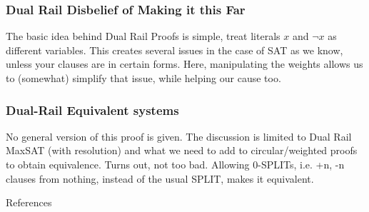 \documentclass[aspectratio=169]{beamer}
\newcounter{notes}
\begin{document}
    \begin{frame}
        \frametitle{Dual Rail Disbelief of Making it this Far}
    
        The basic idea behind Dual Rail Proofs is simple, treat literals $x$ and
        $\lnot x$ as different variables. \pause This creates several issues in
        the case of SAT as we know, unless your clauses are in certain forms.
        \pause Here, manipulating the weights allows us to (somewhat) simplify
        that issue, while helping our cause too. 
    
    \end{frame}

    \begin{frame}
        \frametitle{Dual-Rail Equivalent systems }
    
        No general version of this proof is given. The discussion is limited to
        Dual Rail MaxSAT (with resolution) and what we need to add to
        circular/weighted proofs to obtain equivalence. \pause Turns out, not
        too bad. \pause Allowing 0-SPLITs, i.e. +n, -n clauses from nothing,
        instead of the usual SPLIT, makes it equivalent.
    
    \end{frame}

    \begin{frame}{References}
        
        
    \end{frame}
\end{document}
